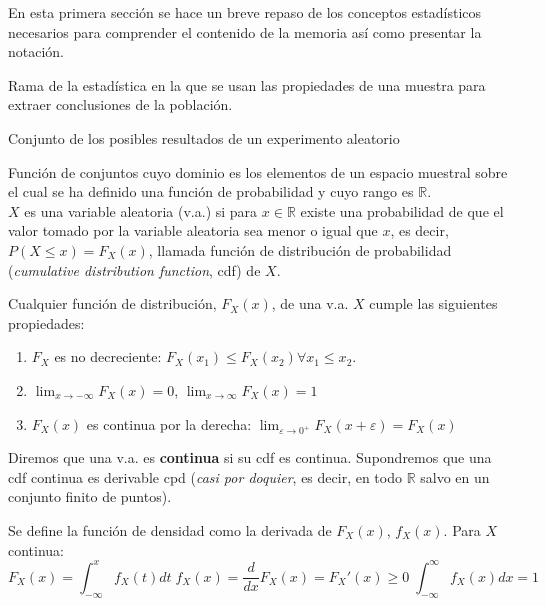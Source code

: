
	En esta primera sección se hace un breve repaso de los conceptos estadísticos necesarios para comprender el contenido de la memoria así como presentar la notación.
	
\begin{definicion}
	Rama de la estadística en la que se usan las propiedades de una muestra para extraer conclusiones de la población. 
\end{definicion}

\begin{definicion} 
	Conjunto de los posibles resultados de un experimento aleatorio
\end{definicion}

\begin{definicion}
	Función de conjuntos cuyo dominio es los elementos de un espacio muestral sobre el cual se ha definido una función de probabilidad y cuyo rango es $\mathbb{R}$.\\
	$X$ es una variable aleatoria (v.a.) si para $x \in \mathbb{R}$ existe una probabilidad de que el valor tomado por la variable aleatoria sea menor o igual que $x$, es decir, $P(X \leq x) = F_X (x)$, llamada función de distribución de probabilidad (\textit{cumulative distribution function}, cdf) de $X$.	
\end{definicion}

Cualquier función de distribución, $F_X(x)$, de una v.a. $X$ cumple las siguientes propiedades: 
\begin{enumerate}
	\item $F_X$ es no decreciente: 
			$F_X(x_1) \leq F_X(x_2) \forall x_1 \leq x_2$.
	\item $\lim_{x \rightarrow -\infty} F_X(x) = 0$,
			$\lim_{x \rightarrow \infty} F_X(x) = 1$
	\item $F_X(x)$ es continua por la derecha: 
		$\lim_{\varepsilon \rightarrow 0^+} F_X(x+\varepsilon) = F_X(x)$
\end{enumerate}

	Diremos que una v.a. es \textbf{continua} si su cdf es continua. Supondremos que una cdf continua es derivable cpd (\textit{casi por doquier}, es decir, en todo $\mathbb{R}$ salvo en un conjunto finito de puntos).
	
\begin{definicion}
	Se define la función de densidad como la derivada de $F_X(x)$, $f_X(x)$. Para $X$ continua:
	\[ F_X(x) = \int_{-\infty}^x f_X(t) dt \;
		f_X(x) = \frac{d}{dx}F_X(x) = F_X'(x) \geq 0 \;
		\int_{-\infty}^{\infty} f_X(x) dx = 1 \]
\end{definicion}
	
